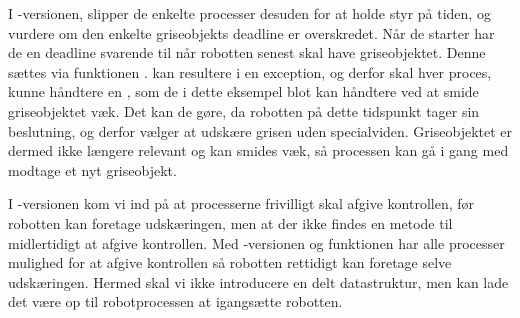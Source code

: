 I -versionen, slipper de enkelte processer desuden for at holde styr på tiden, og vurdere om den enkelte griseobjekts deadline er overskredet. Når de starter har de en deadline svarende til når robotten senest skal have griseobjektet. Denne sættes  via funktionen .  kan resultere i en exception, og derfor skal hver proces, kunne håndtere en , som de i dette eksempel blot kan håndtere ved at smide griseobjektet væk. Det kan de gøre, da robotten på dette tidspunkt tager sin beslutning, og derfor vælger at udskære grisen uden specialviden. Griseobjektet er dermed ikke længere relevant og kan smides væk, så processen kan gå i gang med modtage et nyt griseobjekt.

I -versionen kom vi ind på at processerne frivilligt skal afgive kontrollen, før robotten kan foretage udskæringen, men at der ikke findes en metode til midlertidigt at afgive kontrollen. Med -versionen og funktionen  har alle processer mulighed for at afgive kontrollen så robotten rettidigt kan foretage selve udskæringen. Hermed skal vi ikke introducere en delt datastruktur, men kan lade det være op til robotprocessen at igangsætte robotten.
  



